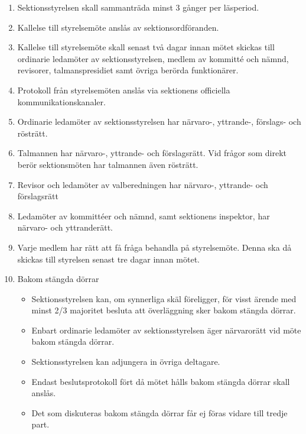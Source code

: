 \documentclass[11pt,a4paper]{article}
\begin{document}
\begin{enumerate}[\thesubsection .1]

\item Sektionsstyrelsen skall sammanträda minst 3 gånger per läsperiod.

\item Kallelse till styrelsemöte anslås av sektionsordföranden.

\item Kallelse till styrelsemöte skall senast två dagar innan mötet skickas till ordinarie ledamöter av sektionsstyrelsen, medlem av kommitté och nämnd, revisorer, talmanspresidiet samt övriga berörda funktionärer.

\item Protokoll från styrelsemöten anslås via sektionens officiella kommunikationskanaler.

\item Ordinarie ledamöter av sektionsstyrelsen har närvaro-, yttrande-, förslags- och rösträtt. 

\item Talmannen har närvaro-, yttrande- och förslagsrätt. Vid frågor som direkt berör sektionsmöten har talmannen även rösträtt. 

\item Revisor och ledamöter av valberedningen har närvaro-, yttrande- och förslagsrätt

\item Ledamöter av kommittéer och nämnd, samt sektionens inspektor, har närvaro- och yttranderätt.

\item Varje medlem har rätt att få fråga behandla på styrelsemöte. Denna ska då skickas till styrelsen senast tre dagar innan mötet.


\item Bakom stängda dörrar

\begin{itemize}
\item Sektionsstyrelsen kan, om synnerliga skäl föreligger, för visst ärende med minst 2/3 majoritet besluta att överläggning sker bakom stängda dörrar.
\item Enbart ordinarie ledamöter av sektionsstyrelsen äger närvarorätt vid möte bakom stängda dörrar.
\item Sektionsstyrelsen kan adjungera in övriga deltagare.
\item Endast beslutsprotokoll fört då mötet hålls bakom stängda dörrar skall anslås.
\item Det som diskuteras bakom stängda dörrar får ej föras vidare till tredje part. 
\end{itemize}

\end{enumerate}
\end{document}
